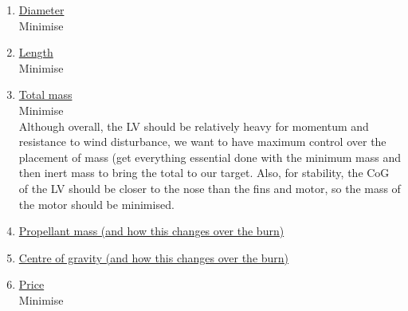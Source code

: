 \documentclass[11pt,table]{article}
\begin{document}
\begin{enumerate}
    \item \underline{Diameter} \\
    Minimise
    
    \item \underline{Length} \\
    Minimise
    
    \item \underline{Total mass} \\
    Minimise \\
	Although overall, the LV should be relatively heavy for momentum and resistance to wind disturbance, we want to have
	maximum control over the placement of mass (get everything essential done with the minimum mass and then inert mass
	to bring the total to our target. Also, for stability, the CoG of the LV should be closer to the nose than the fins
	and motor, so the mass of the motor should be minimised.
    
    \item \underline{Propellant mass (and how this changes over the burn)}
    
    \item \underline{Centre of gravity (and how this changes over the burn)}
    
    
    \item \underline{Price} \\
    Minimise
\end{enumerate}
\end{document}
